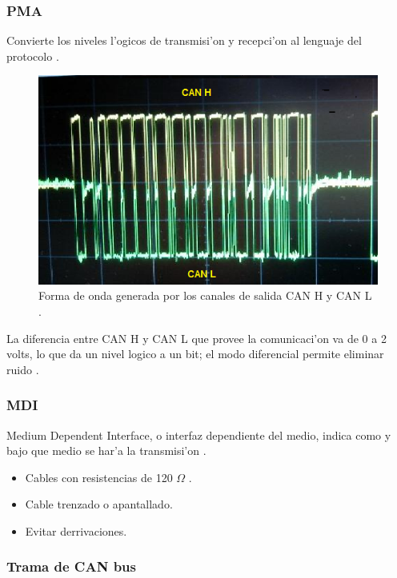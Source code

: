\subsubsection{PMA}
Convierte los niveles l'ogicos de transmisi'on y recepci'on  al lenguaje del protocolo \citep{garcia}.

\begin{figure}[ht]
	\centering
		\includegraphics[scale=0.6]{canhcanl}
	\caption{Forma de onda generada por los canales de salida CAN H y CAN L \citep{garcia}.}
	\label{fig:canhcanl}
\end{figure}

La diferencia entre CAN H y CAN L que provee la comunicaci'on va de 0 a 2 volts, lo que da un nivel logico a un bit; el modo diferencial permite eliminar ruido \citep{garcia}.

\subsubsection{MDI}

Medium Dependent Interface, o interfaz dependiente del medio, indica como y bajo que medio se har'a la transmisi'on \citep{garcia}.

\begin{itemize}
\item Cables con resistencias de 120 $ \Omega $ .
\item Cable trenzado o apantallado.
\item Evitar derrivaciones.
\end{itemize}

\subsubsection{Trama de CAN bus}

